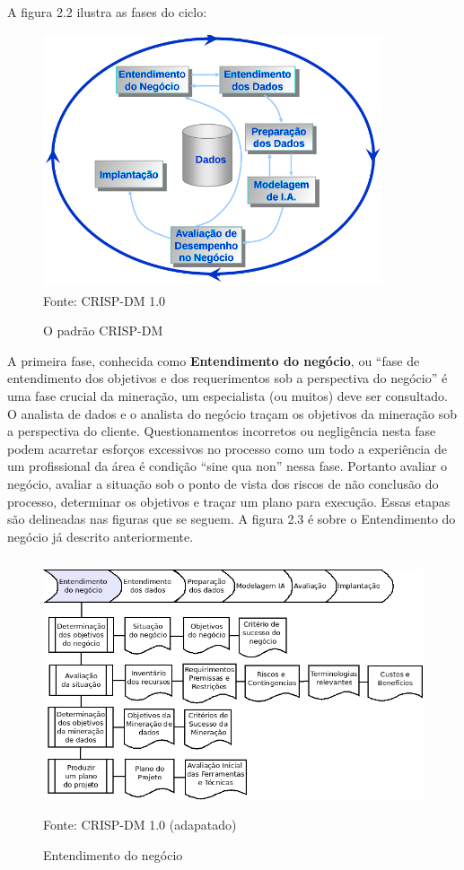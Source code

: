 A figura 2.2 ilustra as fases do ciclo:

\begin{figure}[!ht]
\centering
\caption{O padrão CRISP-DM \cite{Crisp2000}}
\vspace{1mm}
\includegraphics[width=100mm, height=75mm]{Figuras/BigData/CrispDM2.png}\\
\tiny Fonte: CRISP-DM 1.0
\end{figure}

A primeira fase, conhecida como \textbf{Entendimento do negócio}, ou ``fase de entendimento dos objetivos e dos requerimentos sob a 
perspectiva do negócio'' \cite{Chapman2000} é uma fase crucial da mineração,  um especialista (ou muitos) deve ser consultado. 
O analista de dados e o analista do negócio traçam os objetivos da mineração sob a perspectiva do cliente. Questionamentos incorretos 
ou negligência nesta fase podem acarretar esforços excessivos no processo como um todo a experiência de um profissional da área 
é condição ``sine qua non'' nessa fase. Portanto avaliar o negócio, avaliar a situação sob o ponto de vista dos riscos de não conclusão 
do processo, determinar os objetivos e traçar um plano para execução. Essas etapas são delineadas nas figuras que se seguem. A figura 2.3 é sobre o Entendimento do negócio já descrito anteriormente.

\begin{figure}[!ht]
\centering
\caption{Entendimento do negócio}
\vspace{1mm}
\includegraphics[width=120mm, height=75mm]{Figuras/Cronograma/Entendimento.png}\\
\tiny Fonte: CRISP-DM 1.0 (adapatado)
\end{figure}

